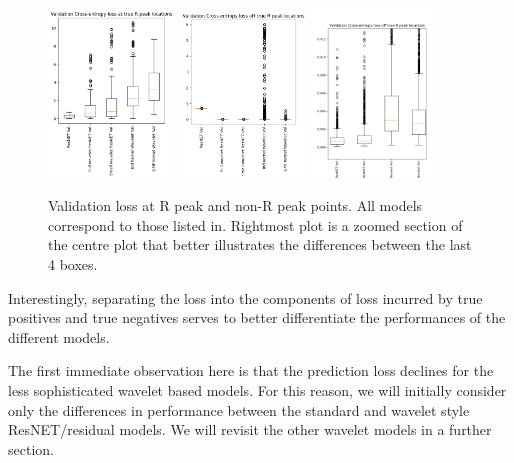 \documentclass[9pt,conference]{IEEEtran}
\begin{document}
\begin{figure}[H]
    \centering
    \includegraphics[width=0.3\textwidth]{valLossAtRBoxplots.png}
    \includegraphics[width=0.3\textwidth]{valLossOffRBoxplots.png}
    \includegraphics[width=0.3\textwidth]{valLossOffRBoxplotsZoomed.png}
    \caption{Validation loss at R peak and non-R peak points. All models correspond to those listed in. Rightmost plot is a zoomed section of the centre plot that better illustrates the differences between the last 4 boxes.}
\end{figure}



Interestingly, separating the loss into the components of loss incurred by true positives and true negatives serves to better differentiate the performances of the different models. 

The first immediate observation here is that the prediction loss declines for the less sophisticated wavelet based models. For this reason, we will initially consider only the differences in performance between the standard and wavelet style ResNET/residual models. We will revisit the other wavelet models in a further section.
\end{document}
